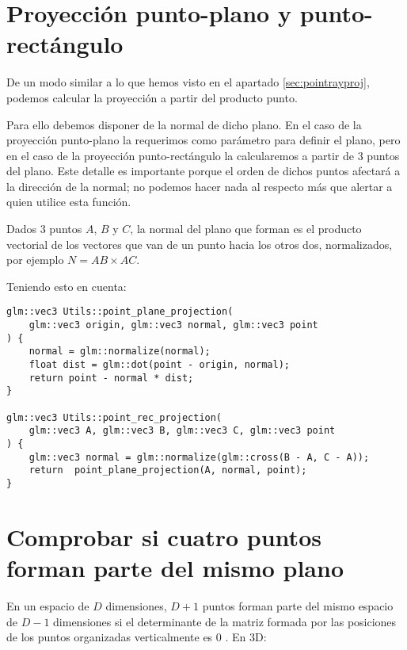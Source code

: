 \clearpage
\section{Proyección punto-plano y punto-rectángulo}
\label{sec:pointplaneproj}
De un modo similar a lo que hemos visto en el apartado \ref{sec:pointrayproj}, podemos calcular la proyección a partir del producto punto.

Para ello debemos disponer de la normal de dicho plano. En el caso de la proyección punto-plano la requerimos como parámetro para definir el plano, pero en el caso de la proyección punto-rectángulo la calcularemos a partir de 3 puntos del plano. Este detalle es importante porque el orden de dichos puntos afectará a la dirección de la normal; no podemos hacer nada al respecto más que alertar a quien utilice esta función.

Dados 3 puntos $A$, $B$ y $C$, la normal del plano que forman es el producto vectorial de los vectores que van de un punto hacia los otros dos, normalizados, por ejemplo $N = AB \times AC$.

Teniendo esto en cuenta:
\begin{lstlisting}
glm::vec3 Utils::point_plane_projection(
    glm::vec3 origin, glm::vec3 normal, glm::vec3 point
) {
	normal = glm::normalize(normal);
	float dist = glm::dot(point - origin, normal);
	return point - normal * dist;
}

glm::vec3 Utils::point_rec_projection(
    glm::vec3 A, glm::vec3 B, glm::vec3 C, glm::vec3 point
) {
	glm::vec3 normal = glm::normalize(glm::cross(B - A, C - A));
	return  point_plane_projection(A, normal, point);
}
\end{lstlisting}


\section{Comprobar si cuatro puntos forman parte del mismo plano}
\label{sec:check4pointplane}
En un espacio de $D$ dimensiones, $D+1$ puntos forman parte del mismo espacio de $D-1$ dimensiones si el determinante de la matriz formada por las posiciones de los puntos organizadas verticalmente es 0 \cite{points_sameplane}. En 3D:

